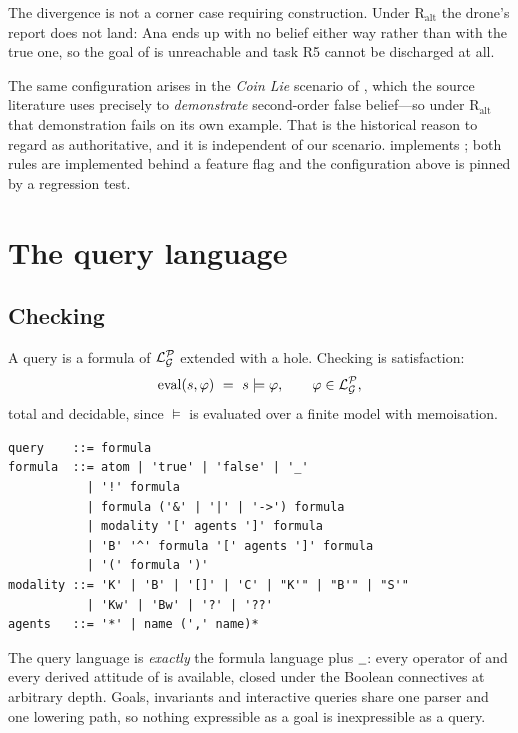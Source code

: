 \documentclass[11pt,a4paper]{article}
\begin{document}
\begin{remark}
\label{rem:divergence}
The divergence is not a corner case requiring construction. Under $\mathrm{R}_{\mathrm{alt}}$
the drone's report does not land: Ana ends up with no belief either way rather than with
the true one, so the goal of  is unreachable and task R5 cannot be
discharged at all.

The same configuration arises in the \emph{Coin Lie} scenario of
\citet{buckingham2021thesis}, which the source literature uses precisely to
\emph{demonstrate} second-order false belief---so under $\mathrm{R}_{\mathrm{alt}}$ that
demonstration fails on its own example. That is the historical reason to regard
 as authoritative, and it is independent of our scenario. \delhi{} implements
; both rules are implemented behind a feature flag and the configuration
above is pinned by a regression test.
\end{remark}

\section{The query language}
\label{sec:query}

\subsection{Checking}

A query is a formula of $\mathcal{L}^{\mathcal{P}}_{\mathcal{G}}$ extended with a hole. Checking is satisfaction:
\[
  \mathrm{eval}(s, \varphi) \ =\ s \models \varphi, \qquad \varphi \in \mathcal{L}^{\mathcal{P}}_{\mathcal{G}} ,
\]
total and decidable, since $\models$ is evaluated over a finite model with memoisation.

\begin{lstlisting}[caption={Query grammar. Precedence, loosest to tightest:
\code{->} (right-associative), \code{|}, \code{\&}, \code{!}, modality.},captionpos=b]
query    ::= formula
formula  ::= atom | 'true' | 'false' | '_'
           | '!' formula
           | formula ('&' | '|' | '->') formula
           | modality '[' agents ']' formula
           | 'B' '^' formula '[' agents ']' formula
           | '(' formula ')'
modality ::= 'K' | 'B' | '[]' | 'C' | "K'" | "B'" | "S'"
           | 'Kw' | 'Bw' | '?' | '??'
agents   ::= '*' | name (',' name)*
\end{lstlisting}

The query language is \emph{exactly} the formula language plus $\hole$: every operator of
 and every derived attitude of  is available, closed under the
Boolean connectives at arbitrary depth. Goals, invariants and interactive queries share one
parser and one lowering path, so nothing expressible as a goal is inexpressible as a query.
\end{document}
